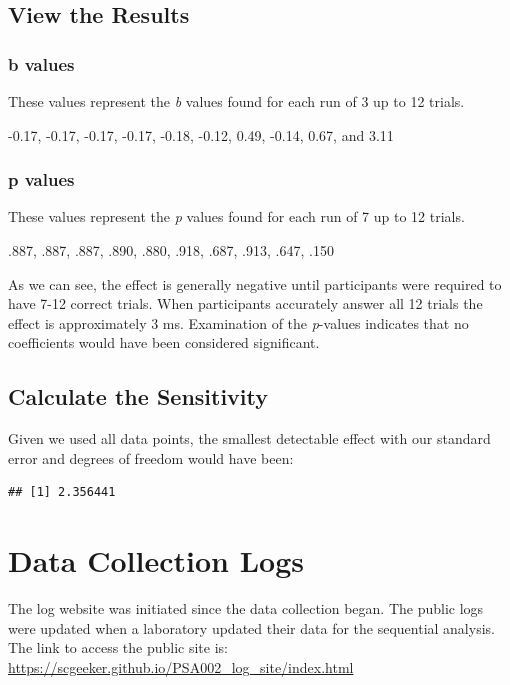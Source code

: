 \documentclass[
  man,floatsintext]{apa7}
\begin{document}
\hypertarget{view-the-results}{%
\subsection{View the Results}\label{view-the-results}}

\hypertarget{b-values}{%
\subsubsection{b values}\label{b-values}}

These values represent the \emph{b} values found for each run of 3 up to 12 trials.

-0.17, -0.17, -0.17, -0.17, -0.18, -0.12, 0.49, -0.14, 0.67, and 3.11

\hypertarget{p-values}{%
\subsubsection{p values}\label{p-values}}

These values represent the \emph{p} values found for each run of 7 up to 12 trials.

.887, .887, .887, .890, .880, .918, .687, .913, .647, .150

As we can see, the effect is generally negative until participants were required to have 7-12 correct trials. When participants accurately answer all 12 trials the effect is approximately 3 ms. Examination of the \emph{p}-values indicates that no coefficients would have been considered significant.

\hypertarget{calculate-the-sensitivity}{%
\subsection{Calculate the Sensitivity}\label{calculate-the-sensitivity}}

Given we used all data points, the smallest detectable effect with our standard error and degrees of freedom would have been:

\begin{verbatim}
## [1] 2.356441
\end{verbatim}

\hypertarget{data-collection-logs}{%
\section{Data Collection Logs}\label{data-collection-logs}}

The log website was initiated since the data collection began. The public logs were updated when a laboratory updated their data for the sequential analysis. The link to access the public site is: \url{https://scgeeker.github.io/PSA002_log_site/index.html}
\end{document}
